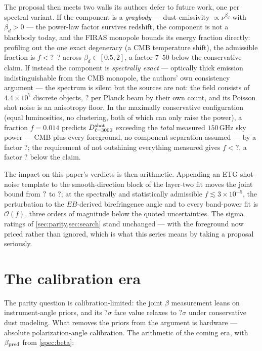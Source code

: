 \documentclass[11pt,a4paper]{article}
\newcommand{\CFBetaZDust}{?}\newcommand{\CFBetaZFace}{?}
\newcommand{\CFGKFirasBest}{?}\newcommand{\CFGKFirasWorst}{?}
\newcommand{\CFGKShotFmax}{?}\newcommand{\CFGKOverpred}{?}
\newcommand{\CFGKClaimedOverAllowed}{?}\newcommand{\CFGKPerBeam}{?}
\newcommand{\CFULTriShot}{?}
\theoremstyle{plain}
\theoremstyle{definition}
\begin{document}
The proposal then meets two walls its authors defer to future work, one
per spectral variant. If the component is a \emph{graybody} --- dust
emissivity $\propto\nu^{\beta_{d}}$ with $\beta_{d}>0$ --- the
power-law factor survives redshift, the component is not a blackbody
today, and the FIRAS monopole bounds its energy fraction directly:
profiling out the one exact degeneracy (a CMB temperature shift), the
admissible fraction is $f<\CFGKFirasBest$--$\CFGKFirasWorst$ across
$\beta_{d}\in[0.5,2]$, a factor $7$--$50$ below the conservative
claim. If instead the component is \emph{spectrally exact} ---
optically thick emission indistinguishable from the CMB monopole, the
authors' own consistency argument --- the spectrum is silent but the
sources are not: the field consists of $4.4\times10^{7}$ discrete
objects, $\CFGKPerBeam$ per Planck beam by their own count, and its
Poisson shot noise is an anisotropy floor. In the maximally
conservative configuration (equal luminosities, no clustering, both of
which can only raise the power), a fraction $f=0.014$ predicts
$D_{\ell=3000}^{\rm shot}$ exceeding the \emph{total} measured
$150\,$GHz sky power --- CMB plus every foreground, no component
separation assumed --- by a factor $\CFGKOverpred$; the requirement
of not outshining everything measured gives $f<\CFGKShotFmax$, a
factor $\CFGKClaimedOverAllowed$ below the claim.

The impact on this paper's verdicts is then arithmetic. Appending an
ETG shot-noise template to the smooth-direction block of the
layer-two fit moves the joint bound from $?$ to
$\CFULTriShot$; at the spectrally and statistically admissible
$f\lesssim3\times10^{-5}$, the perturbation to the $EB$-derived
birefringence angle and to every band-power fit is
$\mathcal{O}(f)$, three orders of magnitude below the quoted
uncertainties. The sigma ratings of \cref{sec:parity,sec:search}
stand unchanged --- with the foreground now priced rather than
ignored, which is what this series means by taking a proposal seriously.

\section{The calibration era}
\label{sec:calibration}

The parity question is calibration-limited: the joint $\beta$
measurement leans on instrument-angle priors, and its
$\CFBetaZFace\sigma$ face value relaxes to $\CFBetaZDust\sigma$ under
conservative dust modeling. What removes the priors from the argument
is hardware --- absolute polarization-angle calibration. The
arithmetic of the coming era, with $\beta_{\rm pred}$ from
\cref{spec:beta}:
\end{document}
